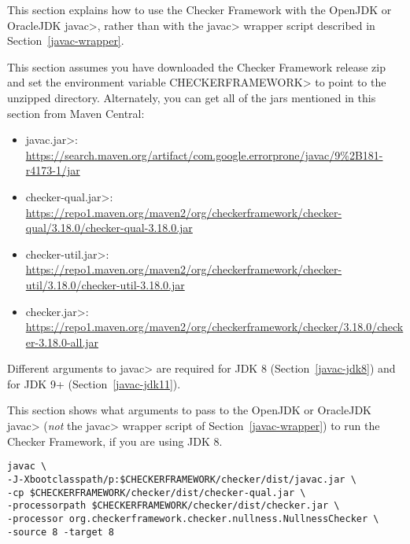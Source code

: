 
This section explains how to use the Checker Framework with the OpenJDK or
OracleJDK \<javac>, rather than with the \<javac> wrapper script described in
Section~\ref{javac-wrapper}.

This
section assumes you have downloaded the Checker Framework release zip and set
the environment variable \<CHECKERFRAMEWORK> to point to the unzipped directory.
Alternately, you can get all of the jars mentioned in this section from Maven Central:

\begin{itemize}
\item \<javac.jar>: \url{https://search.maven.org/artifact/com.google.errorprone/javac/9%2B181-r4173-1/jar}
\item \<checker-qual.jar>: \url{https://repo1.maven.org/maven2/org/checkerframework/checker-qual/3.18.0/checker-qual-3.18.0.jar}
\item \<checker-util.jar>: \url{https://repo1.maven.org/maven2/org/checkerframework/checker-util/3.18.0/checker-util-3.18.0.jar}
\item \<checker.jar>: \url{https://repo1.maven.org/maven2/org/checkerframework/checker/3.18.0/checker-3.18.0-all.jar}
\end{itemize}

Different arguments to \<javac> are required for JDK 8
(Section~\ref{javac-jdk8}) and for JDK 9+ (Section~\ref{javac-jdk11}).



This section shows what arguments to pass to the OpenJDK or OracleJDK
\<javac> (\emph{not} the \<javac> wrapper script of
Section~\ref{javac-wrapper}) to run the Checker
Framework, if you are using JDK 8.

\begin{Verbatim}
javac \
-J-Xbootclasspath/p:$CHECKERFRAMEWORK/checker/dist/javac.jar \
-cp $CHECKERFRAMEWORK/checker/dist/checker-qual.jar \
-processorpath $CHECKERFRAMEWORK/checker/dist/checker.jar \
-processor org.checkerframework.checker.nullness.NullnessChecker \
-source 8 -target 8
\end{Verbatim}


